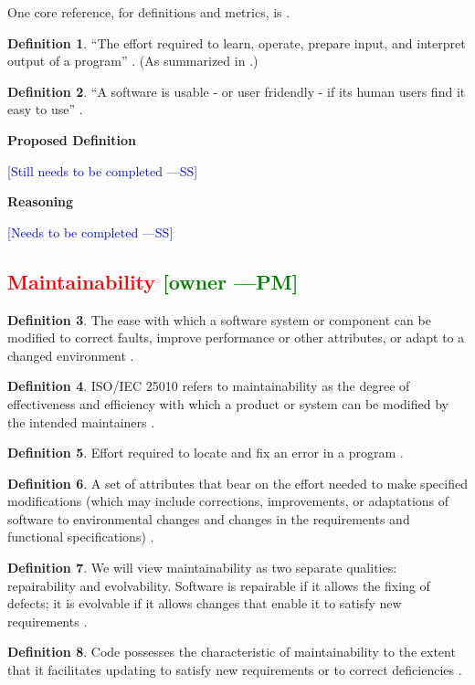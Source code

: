 \documentclass[letterpaper,cleveref]{lipics-v2019}
\newcommand{\authornote}[3]{\textcolor{#1}{[#3 ---#2]}}
\newcommand{\authornote}[3]{}
\newcommand{\wss}[1]{\authornote{blue}{SS}{#1}} %
\newcommand{\pmi}[1]{\authornote{green}{PM}{#1}} %
\newcommand{\notdone}[1]{\textcolor{red}{#1}}
\theoremstyle{definition}
\newtheorem{defn}{Definition}
\begin{document}
One core reference, for definitions and metrics, is
\citet{bevan1995measuring}.

\begin{defn}
  ``The effort required to learn, operate, prepare input, and interpret output
  of a program'' \citep{McCallEtAl1977}. (As summarized in
  \citet{VanVliet2000}.)
\end{defn}

\begin{defn}
``A software is usable - or user fridendly - if its human users find it easy to
use'' \citep{ghezzi1991fundamentals}.
\end{defn}

\noindent \textbf{Proposed Definition}

\wss{Still needs to be completed}

\noindent \textbf{Reasoning}

\wss{Needs to be completed}

\subsection{\notdone{Maintainability} \pmi{owner}}

\begin{defn} \label{MaintainabilityDefnSelected1}
The ease with which a software system or component can be modified to correct
faults, improve performance or other attributes, or adapt to a changed
environment \citep{IEEEStdGlossarySET1990}. 
\end{defn}
\begin{defn}
ISO/IEC 25010 refers to maintainability as the degree of effectiveness and
efficiency with which a product or system can be modified by the intended
maintainers \citep{ISO/IEC25010}.
\end{defn}
\begin{defn}
Effort required to locate and fix an error in a program
\citep{pressman2005software}.
\end{defn}
\begin{defn}
A set of attributes that bear on the effort needed to make specified
modifications (which may include corrections, improvements, or adaptations of
software to environmental changes and changes in the requirements and functional
specifications) \citep{pfleeger2006software}.
\end{defn}
\begin{defn}
We will view maintainability as two separate qualities: repairability and
evolvability. Software is repairable if it allows the fixing of defects; it is
evolvable if it allows changes that enable it to satisfy new requirements
\citep{ghezzi1991fundamentals}.
\end{defn}
\begin{defn} \label{MaintainabilityDefnSelected2}
Code possesses the characteristic of maintainability to the extent that it
facilitates updating to satisfy new requirements or to correct deficiencies
\citep{boehm2007software}.
\end{defn}
\end{document}
